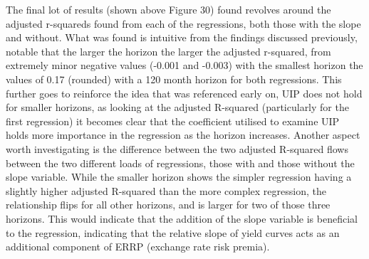 \documentclass[10pt]{article}
\begin{document}
The final lot of results (shown above Figure 30) found revolves around the adjusted r-squareds found from each of the regressions, both those with the slope and without. What was found is intuitive from the findings discussed previously, notable that the larger the horizon the larger the adjusted r-squared, from extremely minor negative values (-0.001 and -0.003) with the smallest horizon the values of 0.17 (rounded) with a 120 month horizon for both regressions. This further goes to reinforce the idea that was referenced early on, UIP does not hold for smaller horizons, as looking at the adjusted R-squared (particularly for the first regression) it becomes clear that the coefficient utilised to examine UIP holds more importance in the regression as the horizon increases. Another aspect worth investigating is the difference between the two adjusted R-squared flows between the two different loads of regressions, those with and those without the slope variable. While the smaller horizon shows the simpler regression having a slightly higher adjusted R-squared than the more complex regression, the relationship flips for all other horizons, and is larger for two of those three horizons. This would indicate that the addition of the slope variable is beneficial to the regression, indicating that the relative slope of yield curves acts as an additional component of ERRP (exchange rate risk premia).
\end{document}
